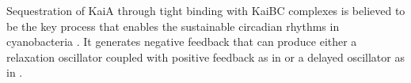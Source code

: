 \documentclass[a4paper,10pt]{article}
\numberwithin{equation}{section}
\begin{document}
 

Sequestration of KaiA through tight binding with KaiBC complexes is believed to be the key process that enables the sustainable circadian rhythms in cyanobacteria . It generates negative feedback that can produce either a relaxation oscillator coupled with positive feedback as in \citet{rust809,phong2012,brett2010} or a delayed oscillator as in
\citet{van2007,clodong2007}.


\end{document}
